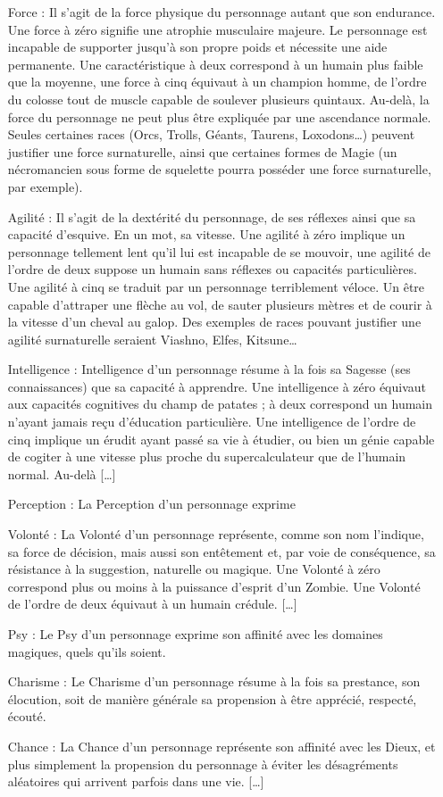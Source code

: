 \begin{itemize}
    \item[Force :] Il s’agit de la force physique du personnage autant que son endurance. Une force à zéro signifie une atrophie musculaire majeure. Le personnage est incapable de supporter jusqu’à son propre poids et nécessite une aide permanente. Une caractéristique à deux correspond à un humain plus faible que la moyenne, une force à cinq équivaut à un champion homme, de l’ordre du colosse tout de muscle capable de soulever plusieurs quintaux. Au-delà, la force du personnage ne peut plus être expliquée par une ascendance normale. Seules certaines races (Orcs, Trolls, Géants, Taurens, Loxodons…) peuvent justifier une force surnaturelle, ainsi que certaines formes de Magie (un nécromancien sous forme de squelette pourra posséder une force surnaturelle, par exemple).
    \item[Agilité :] Il s’agit de la dextérité du personnage, de ses réflexes ainsi que sa capacité d’esquive. En un mot, sa vitesse. Une agilité à zéro implique un personnage tellement lent qu’il lui est incapable de se mouvoir, une agilité de l’ordre de deux suppose un humain sans réflexes ou capacités particulières. Une agilité à cinq se traduit par un personnage terriblement véloce. Un être capable d’attraper une flèche au vol, de sauter plusieurs mètres et de courir à la vitesse d’un cheval au galop. Des exemples de races pouvant justifier une agilité surnaturelle seraient Viashno, Elfes, Kitsune…
    \item[Intelligence :] Intelligence d’un personnage résume à la fois sa Sagesse (ses connaissances) que sa capacité à apprendre. Une intelligence à zéro équivaut aux capacités cognitives du champ de patates ; à deux correspond un humain n’ayant jamais reçu d’éducation particulière. Une intelligence de l’ordre de cinq implique un érudit ayant passé sa vie à étudier, ou bien un génie capable de cogiter à une vitesse plus proche du supercalculateur que de l’humain normal. Au-delà […]
    \item[Perception :] La Perception d’un personnage exprime 
    \item[Volonté :] La Volonté d’un personnage représente, comme son nom l’indique, sa force de décision, mais aussi son entêtement et, par voie de conséquence, sa résistance à la suggestion, naturelle ou magique. Une Volonté à zéro correspond plus ou moins à la puissance d’esprit d’un Zombie. Une Volonté de l’ordre de deux équivaut à un humain crédule. […]
    \item[Psy :] Le Psy d’un personnage exprime son affinité avec les domaines magiques, quels qu’ils soient. 
    \item[Charisme :] Le Charisme d’un personnage résume à la fois sa prestance, son élocution, soit de manière générale sa propension à être apprécié, respecté, écouté. 
    \item[Chance :] La Chance d’un personnage représente son affinité avec les Dieux, et plus simplement la propension du personnage à éviter les désagréments aléatoires qui arrivent parfois dans une vie. […]
\end{itemize}

